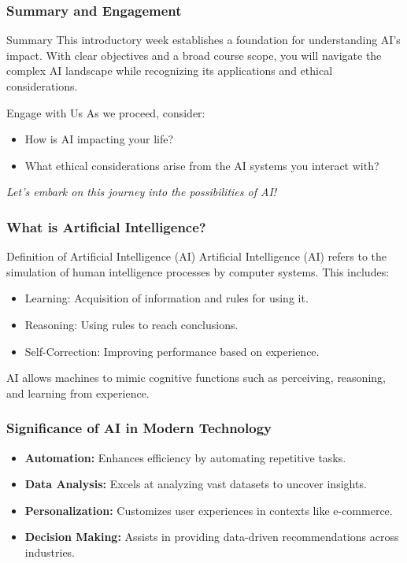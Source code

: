 \documentclass[aspectratio=169]{beamer}
\begin{document}
\begin{frame}[fragile]
    \frametitle{Summary and Engagement}
    \begin{block}{Summary}
        This introductory week establishes a foundation for understanding AI's impact. With clear objectives and a broad course scope, you will navigate the complex AI landscape while recognizing its applications and ethical considerations.
    \end{block}

    \begin{block}{Engage with Us}
        As we proceed, consider:
        \begin{itemize}
            \item How is AI impacting your life?
            \item What ethical considerations arise from the AI systems you interact with?
        \end{itemize}
        \textit{Let's embark on this journey into the possibilities of AI!}
    \end{block}
\end{frame}

\begin{frame}[fragile]
    \frametitle{What is Artificial Intelligence?}
    \begin{block}{Definition of Artificial Intelligence (AI)}
        Artificial Intelligence (AI) refers to the simulation of human intelligence processes by computer systems. This includes:
        \begin{itemize}
            \item Learning: Acquisition of information and rules for using it.
            \item Reasoning: Using rules to reach conclusions.
            \item Self-Correction: Improving performance based on experience.
        \end{itemize}
        AI allows machines to mimic cognitive functions such as perceiving, reasoning, and learning from experience.
    \end{block}
\end{frame}

\begin{frame}[fragile]
    \frametitle{Significance of AI in Modern Technology}
    \begin{itemize}
        \item \textbf{Automation:} Enhances efficiency by automating repetitive tasks.
        \item \textbf{Data Analysis:} Excels at analyzing vast datasets to uncover insights.
        \item \textbf{Personalization:} Customizes user experiences in contexts like e-commerce.
        \item \textbf{Decision Making:} Assists in providing data-driven recommendations across industries.
    \end{itemize}
\end{frame}
\end{document}
